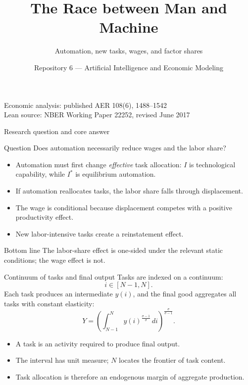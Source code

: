\documentclass[aspectratio=169,10pt]{beamer}
\title{The Race between Man and Machine}
\subtitle{Automation, new tasks, wages, and factor shares}
\author{Repository 6 --- Artificial Intelligence and Economic Modeling}
\institute{Acemoglu \& Restrepo (AER, 2018)}
\date{}
\newcommand{\Istar}{I^{*}}
\begin{document}
\begin{frame}
  \titlepage
  \vspace{-1em}
  \begin{center}
    \small Economic analysis: published AER 108(6), 1488--1542\\
    Lean source: NBER Working Paper 22252, revised June 2017
  \end{center}
\end{frame}

\begin{frame}{Research question and core answer}
\begin{block}{Question}
Does automation necessarily reduce wages and the labor share?
\end{block}
\begin{itemize}
  \item Automation must first change \emph{effective} task allocation:
        $I$ is technological capability, while $\Istar$ is equilibrium automation.
  \item If automation reallocates tasks, the labor share falls through
        \alert{displacement}.
  \item The wage is conditional because displacement competes with a positive
        \alert{productivity effect}.
  \item New labor-intensive tasks create a \alert{reinstatement effect}.
\end{itemize}
\begin{alertblock}{Bottom line}
The labor-share effect is one-sided under the relevant static conditions; the
wage effect is not.
\end{alertblock}
\end{frame}

\begin{frame}{Continuum of tasks and final output}
Tasks are indexed on a continuum:
\[
  i\in[N-1,N].
\]
Each task produces an intermediate $y(i)$, and the final good aggregates all
tasks with constant elasticity:
\[
  Y=\left(\int_{N-1}^{N} y(i)^{\frac{\sigma-1}{\sigma}}\,di
  \right)^{\frac{\sigma}{\sigma-1}}.
\]
\begin{itemize}
  \item A task is an activity required to produce final output.
  \item The interval has unit measure; $N$ locates the frontier of task content.
  \item Task allocation is therefore an endogenous margin of aggregate production.
\end{itemize}
\end{frame}
\end{document}
